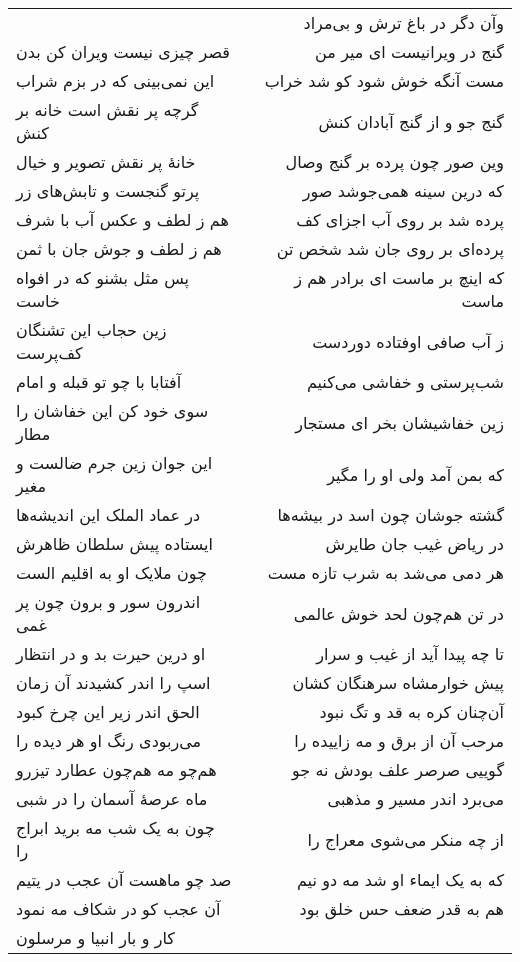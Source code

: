 \begin{center}
\begin{longtable}{l p{0.5cm} r}
&&
وآن دگر در باغ ترش و بی‌مراد
\\
قصر چیزی نیست ویران کن بدن
&&
گنج در ویرانیست ای میر من
\\
این نمی‌بینی که در بزم شراب
&&
مست آنگه خوش شود کو شد خراب
\\
گرچه پر نقش است خانه بر کنش
&&
گنج جو و از گنج آبادان کنش
\\
خانهٔ پر نقش تصویر و خیال
&&
وین صور چون پرده بر گنج وصال
\\
پرتو گنجست و تابش‌های زر
&&
که درین سینه همی‌جوشد صور
\\
هم ز لطف و عکس آب با شرف
&&
پرده شد بر روی آب اجزای کف
\\
هم ز لطف و جوش جان با ثمن
&&
پرده‌ای بر روی جان شد شخص تن
\\
پس مثل بشنو که در افواه خاست
&&
که اینچ بر ماست ای برادر هم ز ماست
\\
زین حجاب این تشنگان کف‌پرست
&&
ز آب صافی اوفتاده دوردست
\\
آفتابا با چو تو قبله و امام
&&
شب‌پرستی و خفاشی می‌کنیم
\\
سوی خود کن این خفاشان را مطار
&&
زین خفاشیشان بخر ای مستجار
\\
این جوان زین جرم ضالست و مغیر
&&
که بمن آمد ولی او را مگیر
\\
در عماد الملک این اندیشه‌ها
&&
گشته جوشان چون اسد در بیشه‌ها
\\
ایستاده پیش سلطان ظاهرش
&&
در ریاض غیب جان طایرش
\\
چون ملایک او به اقلیم الست
&&
هر دمی می‌شد به شرب تازه مست
\\
اندرون سور و برون چون پر غمی
&&
در تن هم‌چون لحد خوش عالمی
\\
او درین حیرت بد و در انتظار
&&
تا چه پیدا آید از غیب و سرار
\\
اسپ را اندر کشیدند آن زمان
&&
پیش خوارمشاه سرهنگان کشان
\\
الحق اندر زیر این چرخ کبود
&&
آن‌چنان کره به قد و تگ نبود
\\
می‌ربودی رنگ او هر دیده را
&&
مرحب آن از برق و مه زاییده را
\\
هم‌چو مه هم‌چون عطارد تیزرو
&&
گوییی صرصر علف بودش نه جو
\\
ماه عرصهٔ آسمان را در شبی
&&
می‌برد اندر مسیر و مذهبی
\\
چون به یک شب مه برید ابراج را
&&
از چه منکر می‌شوی معراج را
\\
صد چو ماهست آن عجب در یتیم
&&
که به یک ایماء او شد مه دو نیم
\\
آن عجب کو در شکاف مه نمود
&&
هم به قدر ضعف حس خلق بود
\\
کار و بار انبیا و مرسلون

\end{longtable}
\end{center}

